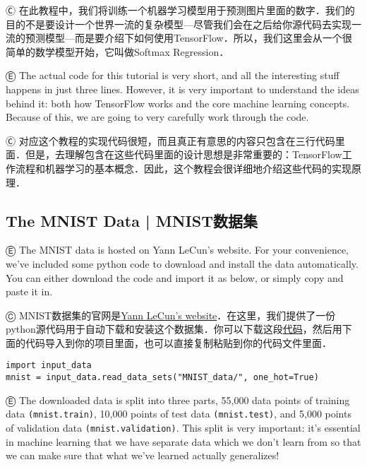 Ⓒ 在此教程中，我们将训练一个机器学习模型用于预测图片里面的数字．我们的目的不是要设计一个世界一流的复杂模型---尽管我们会在之后给你源代码去实现一流的预测模型---而是要介绍下如何使用TensorFlow．所以，我们这里会从一个很简单的数学模型开始，它叫做Softmax Regression．

Ⓔ \textcolor{etc}{The actual code for this tutorial is very short, and all the interesting stuff happens in just three lines. However, it is very important to understand the ideas behind it: both how TensorFlow works and the core machine learning concepts. Because of this, we are going to very carefully work through the code.}

Ⓒ 对应这个教程的实现代码很短，而且真正有意思的内容只包含在三行代码里面．但是，去理解包含在这些代码里面的设计思想是非常重要的：TensorFlow工作流程和机器学习的基本概念．因此，这个教程会很详细地介绍这些代码的实现原理．

\subsection {The MNIST Data  |  MNIST数据集}

Ⓔ \textcolor{etc}{The MNIST data is hosted on Yann LeCun's website. For your convenience, we've included some python code to download and install the data automatically. You can either download the code and import it as below, or simply copy and paste it in.}

Ⓒ MNIST数据集的官网是\href{http://yann.lecun.com/exdb/mnist/}{Yann LeCun's website}．在这里，我们提供了一份python源代码用于自动下载和安装这个数据集．你可以下载这段\href{https://tensorflow.googlesource.com/tensorflow/+/master/tensorflow/examples/tutorials/mnist/input_data.py}{代码}，然后用下面的代码导入到你的项目里面，也可以直接复制粘贴到你的代码文件里面．


\begin{lstlisting}
import input_data
mnist = input_data.read_data_sets("MNIST_data/", one_hot=True)
\end{lstlisting}

Ⓔ \textcolor{etc}{The downloaded data is split into three parts, 55,000 data points of training data \lstinline{(mnist.train)}, 10,000 points of test data \lstinline{(mnist.test)}, and 5,000 points of validation data \lstinline{(mnist.validation)}. This split is very important: it's essential in machine learning that we have separate data which we don't learn from so that we can make sure that what we've learned actually generalizes!}

